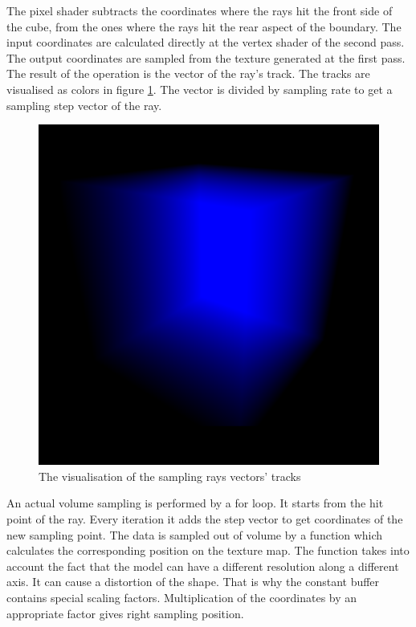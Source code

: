 \documentclass[twoside, english, 11pt]{report}
\begin{document}
The pixel shader subtracts the coordinates where the rays hit the front side of the cube, from the ones where the rays hit the rear aspect of the boundary. The input coordinates are calculated directly at the vertex shader of the second pass. The output coordinates are sampled from the texture generated at the first pass. The result of the operation is the vector of the ray's track. The tracks are visualised as colors in figure \ref{fig:final}. The vector is divided by sampling rate to get a sampling step vector of the ray.
\begin{figure}[!h]
\centerline{\includegraphics[scale = 0.3]{img/final}}
\caption{The visualisation of the sampling rays vectors' tracks \label{fig:final}}
\end{figure}
An actual volume sampling is performed by a for loop. It starts from the hit point of the ray. Every iteration it adds the step vector to get coordinates of the new sampling point. The data is sampled out of volume by a function which calculates the corresponding position on the texture map. The function takes into account the fact that the model can have a different resolution along a different axis. It can cause a distortion of the shape. That is why the constant buffer contains special scaling factors. Multiplication of the coordinates by an appropriate factor gives right sampling position.\\
\end{document}
